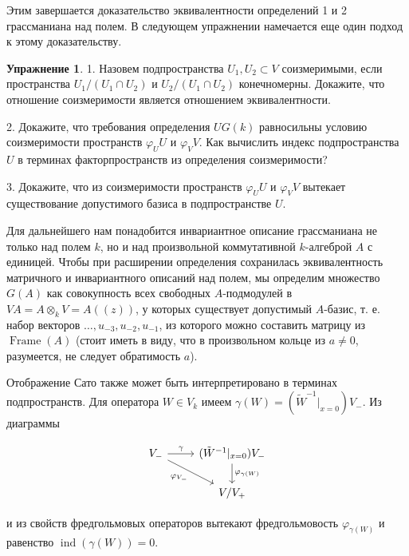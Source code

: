 \documentclass{article}
\theoremstyle{definition}
\theoremstyle{definition} %
\theoremstyle{remark}     %
\theoremstyle{definition}
\theoremstyle{definition}
\theoremstyle{definition}
\theoremstyle{definition}
\theoremstyle{definition}
\theoremstyle{definition}
\theoremstyle{definition}
\theoremstyle{definition}
\newtheorem{exercise}{Упражнение}[section]
\begin{document}
Этим завершается доказательство эквивалентности определений 1 и 2 грассманиана над полем. В следующем упражнении намечается еще один подход к этому доказательству.

\begin{exercise}
  1. Назовем подпространства \( U_1, U_2 \subset V \) соизмеримыми, если пространства \( U_1/(U_1 \cap U_2) \) и \( U_2/(U_1 \cap U_2) \) конечномерны. Докажите, что отношение соизмеримости является отношением эквивалентности.

  2. Докажите, что требования определения \( UG(k) \) равносильны условию соизмеримости пространств \( \varphi_U U \) и \( \varphi_V V \). Как вычислить индекс подпространства \( U \) в терминах факторпространств из определения соизмеримости?

  3. Докажите, что из соизмеримости пространств \( \varphi_U U \) и \( \varphi_V V \) вытекает существование допустимого базиса в подпространстве \( U \).
\end{exercise}

Для дальнейшего нам понадобится инвариантное описание грассманиана не только над полем \( k \), но и над произвольной коммутативной \( k \)-алгеброй \( A \) с единицей. Чтобы при расширении определения сохранилась эквивалентность матричного и инвариантного описаний над полем, мы определим множество \( G(A) \) как совокупность всех свободных \( A \)-подмодулей в \( VA = A \otimes_k V = A((z)) \), у которых существует допустимый \( A \)-базис, т. е. набор векторов \( \dots, u_{-3}, u_{-2}, u_{-1} \), из которого можно составить матрицу из \(\operatorname{Frame}(A)\) (стоит иметь в виду, что в произвольном кольце из \( a \neq 0 \), разумеется, не следует обратимость \( a \)).

Отображение Сато также может быть интерпретировано в терминах подпространств. Для оператора \( W \in V_k \) имеем \( \gamma(W) = (\tilde{W}^{-1}|_{x=0})V_- \). Из диаграммы


\begingroup
{}
\[
\begin{tikzcd}
	V_- & {(\tilde{W}^{-1}|_{x=0})V_-} \\
	& V/V_+
	\arrow["\gamma", from=1-1, to=1-2]
	\arrow["\varphi_{V_-}"', from=1-1, to=2-2]
	\arrow["\varphi_{\gamma(W)}", from=1-2, to=2-2]
\end{tikzcd}
\]
\endgroup

и из свойств фредгольмовых операторов вытекают фредгольмовость \(\varphi_{\gamma(W)}\) и равенство \(\operatorname{ind}(\gamma(W)) = 0\).
\end{document}
